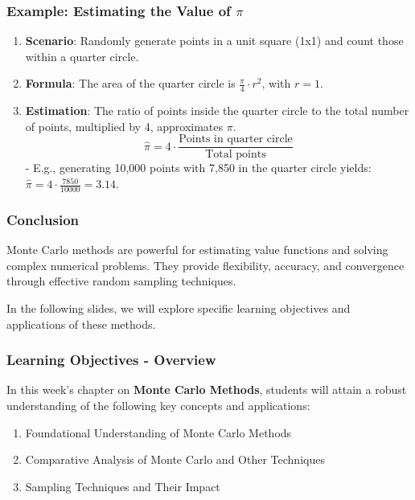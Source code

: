 \documentclass[aspectratio=169]{beamer}
\begin{document}
\begin{frame}[fragile]
    \frametitle{Example: Estimating the Value of $\pi$}
    \begin{enumerate}
        \item \textbf{Scenario}: Randomly generate points in a unit square (1x1) and count those within a quarter circle.
        
        \item \textbf{Formula}: The area of the quarter circle is $\frac{\pi}{4} \cdot r^2$, with $r = 1$.
        
        \item \textbf{Estimation}: The ratio of points inside the quarter circle to the total number of points, multiplied by 4, approximates $\pi$.
        \begin{equation}
            \hat{\pi} = 4 \cdot \frac{\text{Points in quarter circle}}{\text{Total points}}
        \end{equation}
        - E.g., generating 10,000 points with 7,850 in the quarter circle yields: $\hat{\pi} = 4 \cdot \frac{7850}{10000} = 3.14$.
    \end{enumerate}
\end{frame}

\begin{frame}[fragile]
    \frametitle{Conclusion}
    Monte Carlo methods are powerful for estimating value functions and solving complex numerical problems. They provide flexibility, accuracy, and convergence through effective random sampling techniques. 

    In the following slides, we will explore specific learning objectives and applications of these methods.
\end{frame}

\begin{frame}[fragile]
    \frametitle{Learning Objectives - Overview}
    In this week's chapter on \textbf{Monte Carlo Methods}, students will attain a robust understanding of the following key concepts and applications:
    
    \begin{enumerate}
        \item Foundational Understanding of Monte Carlo Methods
        \item Comparative Analysis of Monte Carlo and Other Techniques
        \item Sampling Techniques and Their Impact
    \end{enumerate}
\end{frame}
\end{document}
